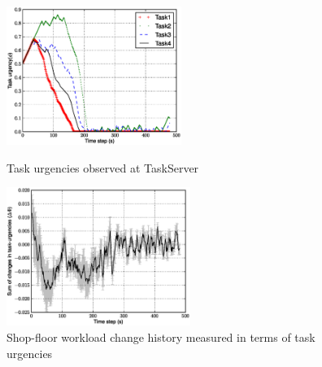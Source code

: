 \documentclass{llncs}
\begin{document}
\begin{figure}
\begin{minipage}[t]{0.48\linewidth}
\centering
\includegraphics[height=4.5cm, angle=0]
{images/PlotUrgencyLog-2010May10-115549.eps}
\caption{\small Task urgencies observed at TaskServer}
\label{fig:raw-urgencies} %
\end{minipage}
\hspace{0.5cm}
\begin{minipage}[t]{0.48\linewidth}
\centering
\includegraphics[height=4.5cm, angle=0]{images/TaskUrgencyStat.eps}
\caption{\small Shop-floor workload change history measured in terms of task urgencies}
\label{fig:urgency-stat} %
\end{minipage}
\end{figure}
\end{document}
